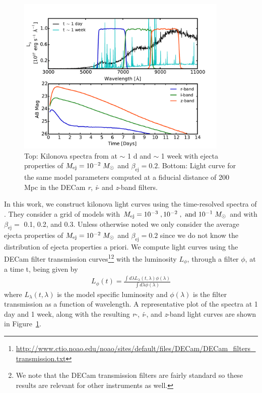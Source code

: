 \begin{figure}[t!]
\centering
\includegraphics[width=0.9\textwidth]{./figs/chapter2/ch2_f1.pdf}
\caption{Top: Kilonova spectra from \citet{BarnesKasen13} at $\sim$ 1 d and $\sim$ 1 week with ejecta properties of $M_{\rm ej} =10^{-2}\;M_{\odot}$ and $\beta_{\text{ej}} = 0.2$. Bottom: Light curve for the same model parameters computed at a fiducial distance of 200 Mpc in the DECam {\em r}, {\em i}- and {\em z}-band filters. \vspace{10pt}}
\label{fig:kilosample}
\end{figure}
   
In this work, we construct kilonova light curves using the time-resolved spectra of \citet{BarnesKasen13}. They consider a grid of models with $M_{\rm ej} = 10^{-3}\;, 10^{-2} \;, \text{ and } 10^{-1} \;M_{\odot}$ and with $\beta_{\text{ej}} = $ 0.1, 0.2, and 0.3. Unless otherwise noted we only consider the average ejecta properties of $M_{\rm ej} =10^{-2}\;M_{\odot}$ and $\beta_{\text{ej}} = 0.2$ since we do not know the distribution of ejecta properties a priori. We compute light curves using the DECam filter transmission curves\footnote{\url{http://www.ctio.noao.edu/noao/sites/default/files/DECam/DECam_filters_transmission.txt}}\footnote{We note that the DECam transmission filters are fairly standard so these results are relevant for other instruments as well.} with the luminosity $L_{\phi}$, through a filter $\phi$, at a time t, being given by 
\begin{align}
\label{eq:LCint}
L_{\phi}(t) = \frac{\int d\lambda L_{\lambda}(t,\lambda) \phi(\lambda)}{\int d\lambda \phi(\lambda)}
\end{align}
\noindent where $L_{\lambda}(t,\lambda)$ is the model specific luminosity and $\phi(\lambda)$ is the filter transmission as a function of wavelength. A representative plot of the spectra at 1 day and 1 week, along with the resulting {\em r}-, {\em i}-, and {\em z}-band light curves are shown in Figure~\ref{fig:kilosample}.
   
